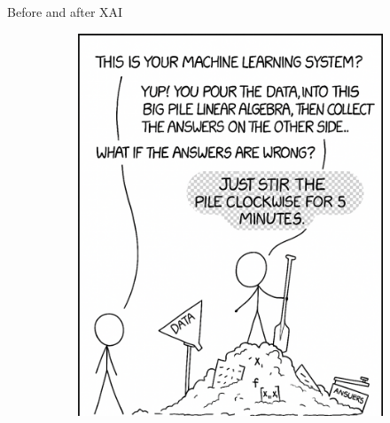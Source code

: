 \begin{frame}{Before and after XAI}
\begin{figure}
\begin{subfigure}[b]{0.45\textwidth}
			\includegraphics[width=\textwidth]{pic/img/XAI/XAIMemeAfter.png}
		\end{subfigure}
\end{figure}
\end{frame}

